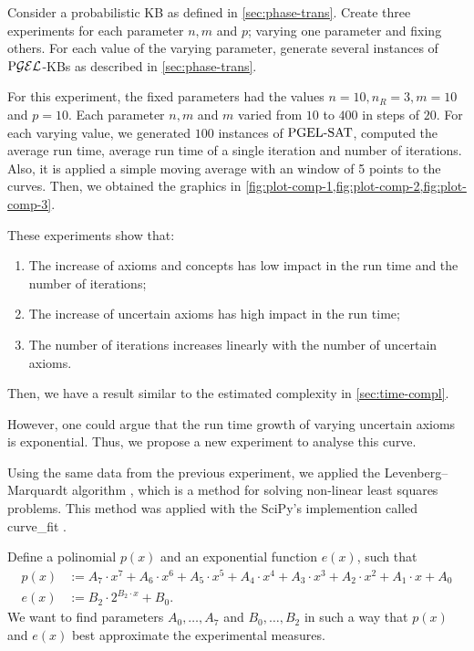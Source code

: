 Consider a probabilistic KB as defined in \cref{sec:phase-trans}. Create three experiments for each parameter $n, m$ and $p$; varying one parameter and fixing others. For each value of the varying parameter, generate several instances of $\text{P}\mathcal{GEL}$-KBs as described in \cref{sec:phase-trans}.

For this experiment, the fixed parameters had the values $n = 10, n_R = 3, m = 10$ and $p = 10$. Each parameter $n, m$ and $m$ varied from $10$ to $400$ in steps of $20$. For each varying value, we generated $100$ instances of $\text{PGEL-SAT}$, computed the average run time, average run time of a single iteration and number of iterations. Also, it is applied a simple moving average with an window of 5 points to the curves.  Then, we obtained the graphics in \cref{fig:plot-comp-1,fig:plot-comp-2,fig:plot-comp-3}. 

These experiments show that:
\begin{enumerate}[label=(\alph*)]
  \item The increase of axioms and concepts has low impact in the run time and the number of iterations;
  \item The increase of uncertain axioms has high impact in the run time;
  \item The number of iterations increases linearly with the number of uncertain axioms.
\end{enumerate}
Then, we have a result similar to the estimated complexity in \cref{sec:time-compl}.

However, one could argue that the run time growth of varying uncertain axioms is exponential. Thus, we propose a new experiment to analyse this curve.

Using the same data from the previous experiment, we applied the Levenberg–Marquardt algorithm \citep{levenberg1944method,marquardt1963algorithm}, which is a method for solving non-linear least squares problems. This method was applied with the SciPy's implemention called \textsf{curve\_fit} \citep{2020SciPy-NMeth}. 

Define a polinomial $p(x)$ and an exponential function $e(x)$, such that
\begin{align*}
  p(x) &:= A_7 \cdot x^7 + A_6 \cdot x^6 + A_5 \cdot x^5 +A_4 \cdot x^4 + A_3 \cdot x^3 + A_2 \cdot x^2 + A_1 \cdot x + A_0\\
  e(x) &:= B_2 \cdot 2^{B_2 \cdot x} + B_0.
\end{align*}
We want to find parameters $A_0, \dots, A_7$ and $B_0, \dots, B_2$ in such a way that $p(x)$ and $e(x)$ best approximate the experimental measures. 


